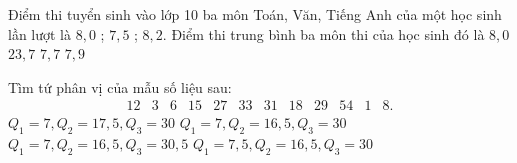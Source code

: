 \begin{ex}%
	Điểm thi tuyển sinh vào lớp 10 ba môn Toán, Văn, Tiếng Anh của một học sinh lần lượt là $8, 0$ ; $ 7,5 $ ; $8,2$. Điểm thi trung bình ba môn thi của học sinh đó là
	\choice
	{$ 8,0  $}
	{$ 23,7  $}
	{$ 7,7  $}
	{\True$ 7,9  $}
\end{ex}

\begin{ex}%
	Tìm tứ phân vị của mẫu số liệu sau:
	$$
	\begin{array}{llllllllllll}
		12 & 3 & 6 & 15 & 27 & 33 & 31 & 18 & 29 & 54 & 1 & 8 .
	\end{array}
	$$
	\choice
	{$Q_1=7, Q_2=17,5, Q_3=30$}
	{$Q_1=7, Q_2=16,5, Q_3=30$}
	{$Q_1=7, Q_2=16,5, Q_3=30,5$}
	{\True $Q_1=7,5, Q_2=16,5, Q_3=30$}
\end{ex}




